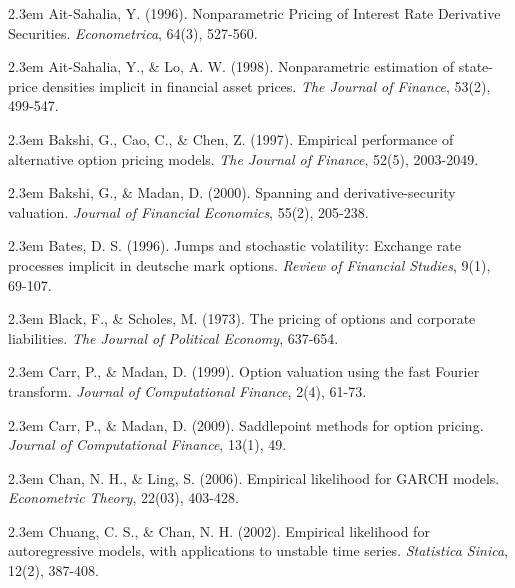 \documentclass[oneside,english]{amsbook}
\numberwithin{section}{chapter}
\numberwithin{equation}{section}
\numberwithin{figure}{section}
\theoremstyle{plain}
\theoremstyle{plain}
\theoremstyle{definition}
\theoremstyle{plain}
\theoremstyle{plain}
\theoremstyle{remark}
\theoremstyle{definition}
\theoremstyle{definition}
\begin{document}


\bigskip
\par\noindent\hangindent2.3em
Ait-Sahalia, Y. (1996). Nonparametric Pricing of Interest Rate Derivative Securities. {\em Econometrica}, 64(3), 527-560.

\par\noindent\hangindent2.3em
Ait-Sahalia, Y., \& Lo, A. W. (1998). Nonparametric estimation of state-price densities implicit in financial asset prices. {\em The Journal of Finance}, 53(2), 499-547.

\par\noindent\hangindent2.3em
Bakshi, G., Cao, C., \& Chen, Z. (1997). Empirical performance of alternative option pricing models. {\em The Journal of Finance}, 52(5), 2003-2049.

\par\noindent\hangindent2.3em
Bakshi, G., \& Madan, D. (2000). Spanning and derivative-security valuation. {\em Journal of Financial Economics}, 55(2), 205-238.

\par\noindent\hangindent2.3em
Bates, D. S. (1996). Jumps and stochastic volatility: Exchange rate processes implicit in deutsche mark options. {\em Review of Financial Studies}, 9(1), 69-107.

\par\noindent\hangindent2.3em
Black, F., \& Scholes, M. (1973). The pricing of options and corporate liabilities. {\em The Journal of Political Economy}, 637-654.

\par\noindent\hangindent2.3em
Carr, P., \& Madan, D. (1999). Option valuation using the fast Fourier transform. {\em Journal of Computational Finance}, 2(4), 61-73.

\par\noindent\hangindent2.3em
Carr, P., \& Madan, D. (2009). Saddlepoint methods for option pricing. {\em Journal of Computational Finance}, 13(1), 49.

\par\noindent\hangindent2.3em
Chan, N. H., \& Ling, S. (2006). Empirical likelihood for GARCH models. {\em Econometric Theory}, 22(03), 403-428.

\par\noindent\hangindent2.3em
Chuang, C. S., \& Chan, N. H. (2002). Empirical likelihood for autoregressive models, with applications to unstable time series. {\em Statistica Sinica}, 12(2), 387-408.
\end{document}
